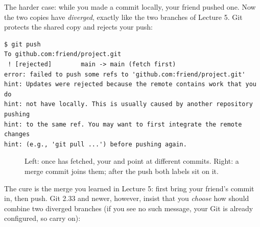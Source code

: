 The harder case: while you made a commit locally, your friend pushed one. Now the two copies have \emph{diverged}, exactly like the two branches of Lecture 5. Git protects the shared copy and rejects your push:

\begin{lstlisting}
$ git push
To github.com:friend/project.git
 ! [rejected]        main -> main (fetch first)
error: failed to push some refs to 'github.com:friend/project.git'
hint: Updates were rejected because the remote contains work that you do
hint: not have locally. This is usually caused by another repository pushing
hint: to the same ref. You may want to first integrate the remote changes
hint: (e.g., 'git pull ...') before pushing again.
\end{lstlisting}

\begin{figure}[H]
\centering
{}
\caption{Left: once  has fetched, your  and  point at different commits. Right: a merge commit joins them; after the push both labels sit on it.}
\label{fig:diverged}
\end{figure}

The cure is the merge you learned in Lecture 5: first bring your friend's commit in, then push. Git 2.33 and newer, however, insist that you \emph{choose} how  should combine two diverged branches (if you see no such message, your Git is already configured, so carry on):

